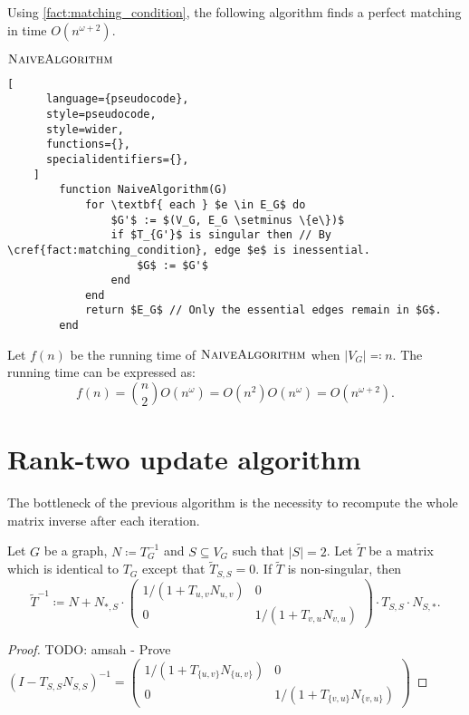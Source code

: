 Using \cref{fact:matching_condition}, the following algorithm finds a perfect matching in time \(O(n^{\omega+2})\).
\begin{programruledcaption}{\(\textsc{NaiveAlgorithm}\)}
    \begin{lstlisting}[
      language={pseudocode},
      style=pseudocode,
      style=wider,
      functions={},
      specialidentifiers={},
    ]
        function NaiveAlgorithm(G)
            for \textbf{ each } $e \in E_G$ do
                $G'$ := $(V_G, E_G \setminus \{e\})$
                if $T_{G'}$ is singular then // By \cref{fact:matching_condition}, edge $e$ is inessential.
                    $G$ := $G'$ 
                end
            end
            return $E_G$ // Only the essential edges remain in $G$.
        end
    \end{lstlisting}
\end{programruledcaption}
\noindent
Let \(f(n)\) be the running time of \(\textsc{NaiveAlgorithm}\) when \(|V_G| \eqcolon n\).
The running time can be expressed as:
\[
    f(n) = \binom{n}{2} O(n^\omega) = O(n^2) O(n^\omega) = O(n^{\omega+2}).
\]

\section{Rank-two update algorithm}

The bottleneck of the previous algorithm is the necessity to recompute the whole matrix inverse after each iteration.

\begin{theorem}
\label{thm:rank-two}
    Let \(G\) be a graph, \(N \coloneqq T_G^{-1}\) and \(S \subseteq V_G\) such that \(|S| = 2\). 
    Let \(\tilde{T}\) be a matrix which is identical to \(T_G\) except that \(\tilde{T}_{S, S} = 0\).
    If \(\tilde{T}\) is non-singular, then
    \[
        \tilde{T}^{-1} \coloneqq N + N_{*, S} \cdot 
        \begin{pmatrix}
            1 / (1 + T_{u, v}N_{u, v}) & 0 \\
            0 &  1 / (1 + T_{v, u}N_{v, u})
        \end{pmatrix}
        \cdot T_{S, S} \cdot N_{S, *}.
    \]
\end{theorem}

\begin{proof}
TODO: amsah - Prove \((I - T_{S, S}N_{S, S})^{-1} = 
        \begin{pmatrix}
            1 / (1 + T_{\{u, v\}}N_{\{u, v\}}) & 0 \\
            0 &  1 / (1 + T_{\{v, u\}}N_{\{v, u\}})
        \end{pmatrix} \)
\end{proof}

